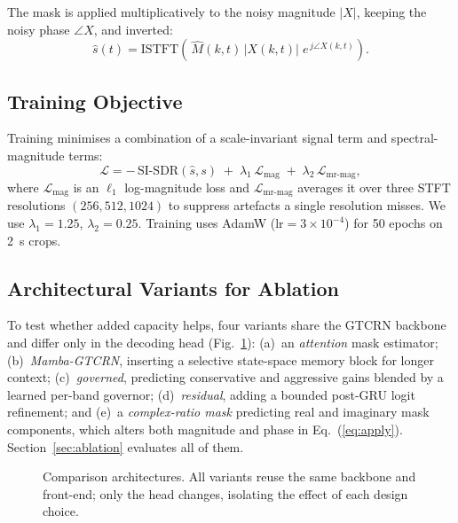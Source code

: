 \documentclass[runningheads]{llncs}
\begin{document}
The mask is applied multiplicatively to the noisy magnitude $|X|$, keeping the
noisy phase $\angle X$, and inverted:
\begin{equation}
\hat{s}(t) = \text{ISTFT}\!\left(\,\hat{M}(k,t)\,|X(k,t)|\;e^{\,j\angle X(k,t)}\right).
\label{eq:apply}
\end{equation}

\subsection{Training Objective}
Training minimises a combination of a scale-invariant signal term and
spectral-magnitude terms:
\begin{equation}
\mathcal{L} = -\,\text{SI-SDR}(\hat{s},s)
\;+\;\lambda_{1}\,\mathcal{L}_{\text{mag}}
\;+\;\lambda_{2}\,\mathcal{L}_{\text{mr-mag}},
\label{eq:loss}
\end{equation}
where $\mathcal{L}_{\text{mag}}$ is an $\ell_1$ log-magnitude loss and
$\mathcal{L}_{\text{mr-mag}}$ averages it over three STFT resolutions
$(256,512,1024)$ to suppress artefacts a single resolution misses. We use
$\lambda_{1}=1.25$, $\lambda_{2}=0.25$. Training uses AdamW
($\text{lr}=3\times10^{-4}$) for 50 epochs on \SI{2}{\second} crops.

\subsection{Architectural Variants for Ablation}
To test whether added capacity helps, four variants share the GTCRN backbone
and differ only in the decoding head (Fig.~\ref{fig:variants}):
(a)~an \emph{attention} mask estimator; (b)~\emph{Mamba-GTCRN}, inserting a
selective state-space memory block for longer context;
(c)~\emph{governed}, predicting conservative and aggressive gains blended by a
learned per-band governor; (d)~\emph{residual}, adding a bounded post-GRU logit
refinement; and (e)~a \emph{complex-ratio mask} predicting real and imaginary
mask components, which alters both magnitude and phase in
Eq.~(\ref{eq:apply}). Section~\ref{sec:ablation} evaluates all of them.

\begin{figure}[t]
\centering
{}
\caption{Comparison architectures. All variants reuse the same backbone and
front-end; only the head changes, isolating the effect of each design choice.}
\label{fig:variants}
\end{figure}
\end{document}
